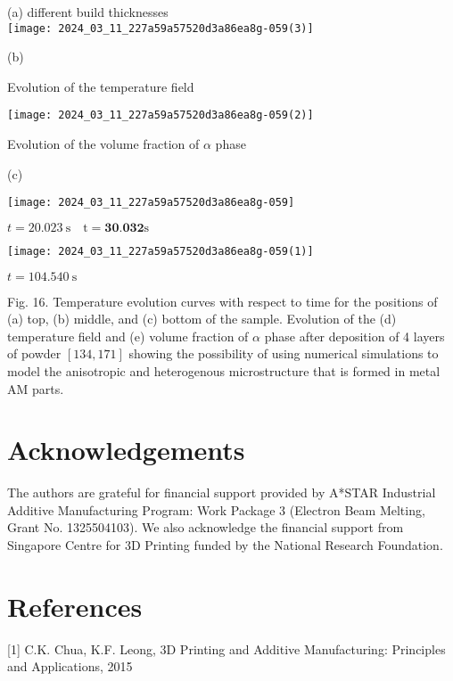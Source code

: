 \documentclass[10pt]{article}
\begin{document}
(a) different build thicknesses\\
\texttt{[image: 2024\_03\_11\_227a59a57520d3a86ea8g-059(3)]}

(b)

Evolution of the temperature field

\begin{center}
\texttt{[image: 2024\_03\_11\_227a59a57520d3a86ea8g-059(2)]}
\end{center}

Evolution of the volume fraction of $\alpha$ phase

(c)

\begin{center}
\texttt{[image: 2024\_03\_11\_227a59a57520d3a86ea8g-059]}
\end{center}

$t=20.023 \mathrm{~s} \quad \mathrm{t}=\mathbf{3 0 . 0 3 2 \mathrm { s }}$

\begin{center}
\texttt{[image: 2024\_03\_11\_227a59a57520d3a86ea8g-059(1)]}
\end{center}

$t=104.540 \mathrm{~s}$

Fig. 16. Temperature evolution curves with respect to time for the positions of (a) top, (b) middle, and (c) bottom of the sample. Evolution of the (d) temperature field and (e) volume fraction of $\alpha$ phase after deposition of 4 layers of powder $[134,171]$ showing the possibility of using numerical simulations to model the anisotropic and heterogenous microstructure that is formed in metal AM parts.

\section*{Acknowledgements}
The authors are grateful for financial support provided by A*STAR Industrial Additive Manufacturing Program: Work Package 3 (Electron Beam Melting, Grant No. 1325504103). We also acknowledge the financial support from Singapore Centre for 3D Printing funded by the National Research Foundation.

\section*{References}
[1] C.K. Chua, K.F. Leong, 3D Printing and Additive Manufacturing: Principles and Applications, 2015
\end{document}

